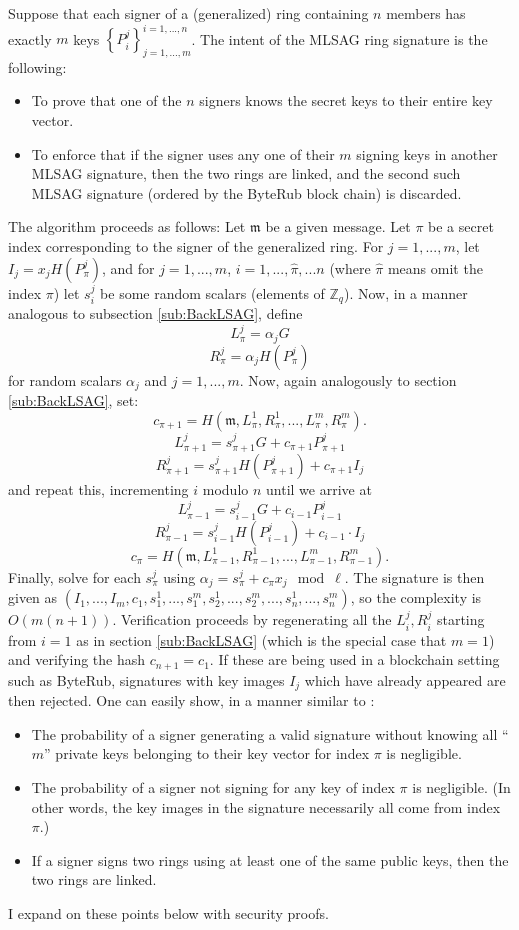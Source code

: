 \documentclass[12pt,english]{mrl}
\theoremstyle{definition}
\numberwithin{equation}{section}
\numberwithin{figure}{section}
\numberwithin{equation}{section}
\numberwithin{equation}{section}
\numberwithin{figure}{section}
\begin{document}
Suppose that each signer of a (generalized) ring containing $n$
members has exactly $m$ keys $\left\{ P_{i}^{j}\right\} _{j=1,...,m}^{i=1,...,n}$.
The intent of the MLSAG ring signature is the following: 
\begin{itemize}
\item To prove that one of the $n$ signers knows the secret keys to their entire key vector. 
\item To enforce that if the signer uses any one of their $m$ signing keys in another MLSAG
signature, then the two rings are linked, and the second such MLSAG signature (ordered by the ByteRub block chain) is discarded. 
\end{itemize}

The algorithm proceeds as follows: Let $\mathfrak{m}$ be a given
message. Let $\pi$ be a secret index corresponding to the signer
of the generalized ring. For $j=1,...,m$, let $I_{j}=x_{j}H\left(P_{\pi}^{j}\right)$,
and for $j=1,...,m$, $i=1,...,\hat{\pi},...n$ (where $\hat{\pi}$
means omit the index $\pi$) let $s_{i}^{j}$ be some random scalars (elements of $\mathbb{Z}_q$).
Now, in a manner analogous to subsection \ref{sub:BackLSAG},
define 
\[
L_{\pi}^{j}=\alpha_{j}G
\]
\[
R_{\pi}^{j}=\alpha_{j}H\left(P_{\pi}^{j}\right)
\]
 for random scalars $\alpha_j$ and $j=1,...,m$. Now, again analogously
to section \ref{sub:BackLSAG}, set:
\[
c_{\pi+1}=H\left(\mathfrak{m},L_{\pi}^{1},R_{\pi}^{1},...,L_{\pi}^{m},R_{\pi}^{m}\right).
\]
\[
L_{\pi+1}^{j}=s_{\pi+1}^{j}G+c_{\pi+1}P_{\pi+1}^{j}
\]
\[
R_{\pi+1}^{j}=s_{\pi+1}^{j}H\left(P_{\pi+1}^{j}\right)+c_{\pi+1}I_{j}
\]
 and repeat this, incrementing $i$ modulo $n$ until we arrive at
\[
L_{\pi-1}^{j}=s_{i-1}^{j}G+c_{i-1}P_{i-1}^{j}
\]
\[
R_{\pi-1}^{j}=s_{i-1}^{j}H\left(P_{i-1}^{j}\right)+c_{i-1}\cdot I_{j}
\]
\[
c_{\pi}=H\left(\mathfrak{m},L_{\pi-1}^{1},R_{\pi-1}^{1},...,L_{\pi-1}^{m},R_{\pi-1}^{m}\right).
\]
 Finally, solve for each $s_{\pi}^{j}$ using $\alpha_{j}=s_{\pi}^{j}+c_{\pi}x_{j} \mod \ell$.
The signature is then given as $\left(I_{1},...,I_{m},c_{1},s_{1}^{1},...,s_{1}^{m},s_{2}^{1},...,s_{2}^{m},...,s_{n}^{1},...,s_{n}^{m}\right)$,
so the complexity is $O\left(m\left(n+1\right)\right).$ 
Verification
proceeds by regenerating all the $L_{i}^{j},R_{i}^{j}$ starting from
$i=1$ as in section \ref{sub:BackLSAG} (which is the special case that $m=1$) and verifying
the hash $c_{n+1}=c_{1}.$ 
If these are being used in a blockchain setting such as ByteRub, signatures with key images $I_j$ which have already appeared are then rejected. 
One can easily show, in a manner similar to \cite{LWW}: 
\begin{itemize}
\item The probability of a signer generating a valid signature without knowing
all ``$m$'' private keys belonging to their key vector for index $\pi$ is negligible. 
\item The probability of a signer not signing for any key of index $\pi$
is negligible. (In other words, the key images in the signature necessarily
all come from index $\pi$.)
\item If a signer signs two rings using at least one of the same public keys, then the two rings are linked.
\end{itemize}
I expand on these points below with security proofs. 
\end{document}
